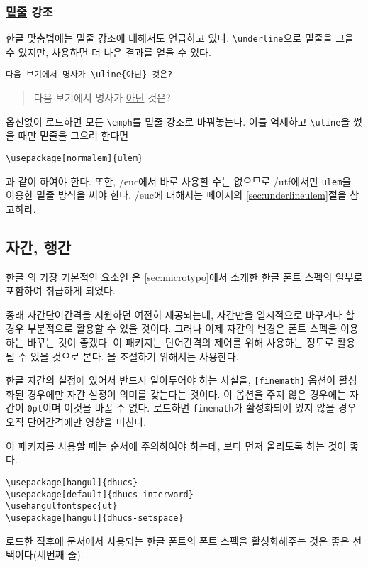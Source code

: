 \subsubsection{\protect\uline{밑줄} 강조}\label{sec:underline}

한글 맞춤법에는 밑줄 강조에 대해서도 언급하고 있다. \verb|\underline|으로
밑줄을 그을 수 있지만, \를 사용하면 더 나은 결과를 얻을
수 있다.

\begin{verbatim}
다음 보기에서 명사가 \uline{아닌} 것은?
\end{verbatim}
\begin{quote}
다음 보기에서 명사가 \uline{아닌} 것은?
\end{quote}

\은 옵션없이 로드하면 모든 \verb|\emph|를 밑줄 강조로
바꿔놓는다. 이를 억제하고 \verb|\uline|을 썼을 때만 밑줄을 그으려 한다면
\begin{verbatim}
\usepackage[normalem]{ulem}
\end{verbatim}
과 같이 하여야 한다. 또한, \을 \kotex/euc에서 바로
사용할 수는 없으므로 \kotex/utf에서만 \texttt{ulem}을 이용한
밑줄 방식을 써야 한다. \kotex/euc에 대해서는 \pageref{sec:underlineulem}
페이지의 \ref{sec:underlineulem}절을 참고하라. 

\subsection{자간, 행간}

한글 의 가장 기본적인 요소인 은 \ref{sec:microtypo}에서 소개한 한글 폰트 스펙의 일부로 포함하여 취급하게 되었다. 

종래 자간\cntrdot 단어간격을 지원하던 \는 여전히
제공되는데, 자간만을 일시적으로 바꾸거나 할 경우 부분적으로 활용할 수 있을 것이다.
그러나 이제 자간의 변경은 폰트 스펙을 이용하는 바꾸는 것이 좋겠다. 이 패키지는
단어간격의 제어를 위해 사용하는 정도로 활용될 수 있을 것으로 본다.
을 조절하기 위해서는 \를 사용한다.

한글 자간의 설정에 있어서 반드시 알아두어야 하는 사실을, \texttt{[finemath]}
옵션이 활성화된 경우에만 자간 설정이 의미를 갖는다는 것이다. 이 옵션을
주지 않은 경우에는 자간이  \texttt{0pt}이며 이것을
바꿀 수 없다. \를 로드하면 \texttt{finemath}가
활성화되어 있지 않을 경우 오직 단어간격에만 영향을 미친다.

이 패키지를 사용할 때는 순서에 주의하여야 하는데, 
\를 보다 \uline{먼저} 올리도록 하는 것이 좋다.
\begin{Verbatim}[fontsize=\small]
\usepackage[hangul]{dhucs}
\usepackage[default]{dhucs-interword}
\usehangulfontspec{ut}
\usepackage[hangul]{dhucs-setspace}
\end{Verbatim}
\를 로드한 직후에 문서에서 사용되는 한글 폰트의
폰트 스펙을 활성화해주는 것은 좋은 선택이다(세번째 줄).

